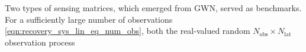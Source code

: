 Two types of
sensing matrices, which emerged from
\ac{GWN}, served as
benchmarks.
For
a sufficiently large
number of
observations
\eqref{eqn:recovery_sys_lin_eq_num_obs}, both
the real-valued random
$N_{\text{obs}} \times N_{\text{lat}}$ observation process
